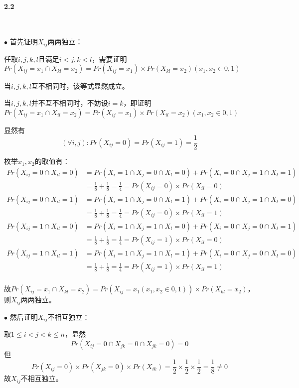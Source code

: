 \paragraph{2.2}~{}

$\bullet$ 首先证明$X_{ij}$两两独立：

任取$i,j,k,l$且满足$i<j,k<l$，需要证明$Pr(X_{ij}=x_1 \cap X_{kl}=x_2) = Pr(X_{ij}=x_1) \times Pr(X_{kl}=x_2) (x_1,x_2 \in {0,1}) $

当$i,j,k,l$互不相同时，该等式显然成立。

当$i,j,k,l$并不互不相同时，不妨设$i=k$，即证明$Pr(X_{ij}=x_1 \cap X_{il}=x_2) = Pr(X_{ij}=x_1) \times Pr(X_{il}=x_2) (x_1,x_2 \in {0,1})$

显然有$$(\forall i,j): Pr(X_{ij}=0) = Pr(X_{ij}=1) = \frac{1}{2}$$

枚举$x_1,x_2$的取值有：
$$
\begin{aligned}
Pr(X_{ij}=0 \cap X_{il}=0) &= Pr(X_i=1 \cap X_j=0 \cap X_l=0) + Pr(X_i=0 \cap X_j=1 \cap X_l=1) \\
 &= \frac{1}{8}+\frac{1}{8} = \frac{1}{4} = Pr(X_{ij}=0) \times Pr(X_{il}=0)\\
Pr(X_{ij}=0 \cap X_{il}=1) &= Pr(X_i=1 \cap X_j=0 \cap X_l=1) + Pr(X_i=0 \cap X_j=1 \cap X_l=0) \\
 &= \frac{1}{8}+\frac{1}{8} = \frac{1}{4} = Pr(X_{ij}=0) \times Pr(X_{il}=1)\\
Pr(X_{ij}=1 \cap X_{il}=0) &= Pr(X_i=1 \cap X_j=1 \cap X_l=0) + Pr(X_i=0 \cap X_j=0 \cap X_l=1)\\
 &= \frac{1}{8}+\frac{1}{8} = \frac{1}{4} = Pr(X_{ij}=1) \times Pr(X_{il}=0)\\
Pr(X_{ij}=1 \cap X_{il}=1) &= Pr(X_i=1 \cap X_j=1 \cap X_l=1) + Pr(X_i=0 \cap X_j=0 \cap X_l=0)\\
 &= \frac{1}{8}+\frac{1}{8} = \frac{1}{4} = Pr(X_{ij}=1) \times Pr(X_{il}=1)\\
\end{aligned}
$$

故$Pr(X_{ij}=x_1 \cap X_{kl}=x_2) = Pr(X_{ij}=x_1 (x_1,x_2 \in {0,1})) \times Pr(X_{kl}=x_2)$，则$X_{ij}$两两独立。

$\bullet$ 然后证明$X_{ij}$不相互独立：

取$1 \le i < j < k \le n$，显然$$Pr(X_{ij}=0 \cap X_{jk}=0 \cap X_{jk}=0) = 0$$
但$$Pr(X_{ij}=0) \times Pr(X_{jk}=0) \times Pr(X_{ik}) = \frac{1}{2} \times \frac{1}{2} \times \frac{1}{2} = \frac{1}{8} \ne 0$$
故$X_{ij}$不相互独立。